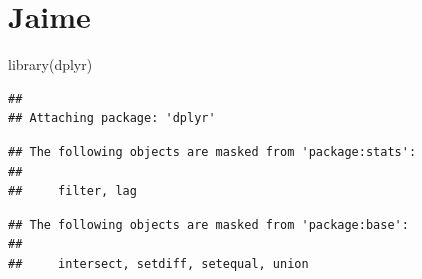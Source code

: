 \documentclass[
]{article}
\newenvironment{Shaded}{\begin{snugshade}}{\end{snugshade}}
\newcommand{\AttributeTok}[1]{\textcolor[rgb]{0.77,0.63,0.00}{#1}}
\newcommand{\FunctionTok}[1]{\textcolor[rgb]{0.00,0.00,0.00}{#1}}
\newcommand{\NormalTok}[1]{#1}
\newcommand{\SpecialCharTok}[1]{\textcolor[rgb]{0.00,0.00,0.00}{#1}}
\begin{document}
\hypertarget{jaime}{%
\section{Jaime}\label{jaime}}

\begin{Shaded}
\begin{Highlighting}[]
\FunctionTok{library}\NormalTok{(dplyr)}
\end{Highlighting}
\end{Shaded}

\begin{verbatim}
## 
## Attaching package: 'dplyr'
\end{verbatim}

\begin{verbatim}
## The following objects are masked from 'package:stats':
## 
##     filter, lag
\end{verbatim}

\begin{verbatim}
## The following objects are masked from 'package:base':
## 
##     intersect, setdiff, setequal, union
\end{verbatim}

\begin{Shaded}
\end{Shaded}
\end{document}
